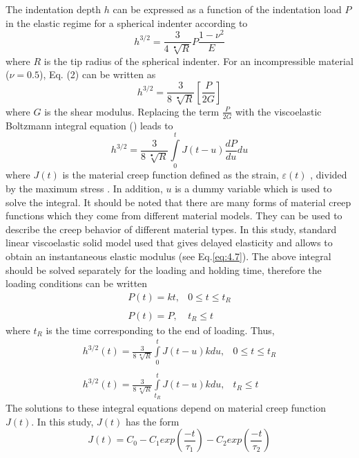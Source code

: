 \documentclass[review]{elsarticle}
\begin{document}
The indentation depth $h$ can be expressed as a function of the indentation load $P$ in the elastic regime for a spherical indenter according to \citep{1960JAM....27..438L}
\begin{equation}
h^{3/2}=\frac{3}{4\ \sqrt[•]{R}}P\frac{1-\nu^2}{E}
\end{equation}
where $R$ is the tip radius of the spherical indenter. For an incompressible material ($\nu=0.5$), Eq. (2) can be written as 
\begin{equation}
h^{3/2}=\frac{3}{8\ \sqrt[•]{R}}[\frac{P}{2G}]
\end{equation}
where $G$ is the shear modulus. Replacing the term $\displaystyle{\frac{P}{2G}}$  with the viscoelastic Boltzmann integral equation (\citep{1960JAM....27..438L}) leads to
\begin{equation}
h^{3/2}=\frac{3}{8\ \sqrt[•]{R}}\int\limits_0^tJ(t-u)\frac{dP}{du}du
\end{equation}
where $J(t)$ is the material creep function defined as the strain, $\varepsilon(t)$ , divided by the maximum stress \citep{Desprat20052224}. In addition, $u$ is a dummy variable which is used to solve the integral. It should be noted that there are many forms of material creep functions which they come from different material models. They can be used to describe the creep behavior of different material types. In this study, standard linear viscoelastic solid model used that gives delayed elasticity and allows to obtain an instantaneous elastic modulus (see Eq.\eqref{eq:4.7}). The above integral should be solved separately for the loading and holding time, therefore the loading conditions can be written 
\begin{eqnarray}
P(t) =kt,&0\leq t \leq t_R  \nonumber \\
\\
P(t) =P,&t_R\leq t \nonumber 
\end{eqnarray}
where $t_R$ is the time corresponding to the end of loading. Thus,
\begin{eqnarray}
\label{eq:4.6}
h^{3/2}(t)=\frac{3}{8\ \sqrt[•]{R}}\int\limits_0^tJ(t-u)kdu,&0\leq t \leq t_R  \nonumber \\
\\
h^{3/2}(t)=\frac{3}{8\ \sqrt[•]{R}}\int\limits_{t_R}^tJ(t-u)kdu,&t_R\leq t \nonumber 
\end{eqnarray}
The solutions to these integral equations depend on material creep function $J(t)$. In this study, $J(t)$ has the form 
\begin{equation}
J(t)=C_0-C_1exp\left(\frac{-t}{\tau_1}\right)-C_2exp\left(\frac{-t}{\tau_2}\right)
\label{eq:4.7}
\end{equation}
\end{document}
